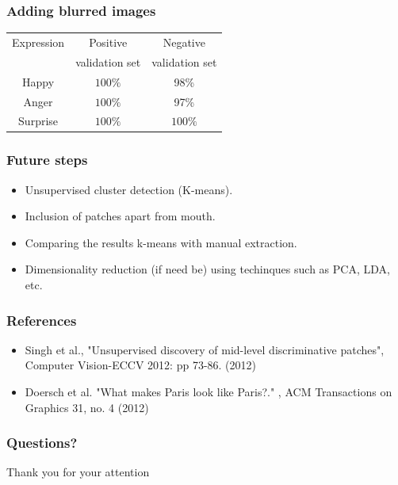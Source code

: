 \documentclass[serif,14pt]{beamer}
\begin{document}
\begin{frame}
  \frametitle{Adding blurred images}
\begin{tabular}{| c | c | c |}
\hline
Expression & Positive  & Negative \\
& validation set & validation set \\
\hline
Happy & $100 \%$ & 98\% \\
Anger & $100\%$ & 97\% \\
Surprise & $100\%$ & $100\%$  \\
\hline
\end{tabular}
\end{frame}

\begin{frame}
  \frametitle{Future steps}
  \begin{itemize}
  	  \item Unsupervised cluster detection (K-means).
      \item Inclusion of patches apart from mouth.
      \item Comparing the results k-means with manual extraction. 
      \item Dimensionality reduction (if need be) using techinques such as PCA, LDA, etc.
 
  \end{itemize}

\end{frame}

\begin{frame}
  \frametitle{References}
  \begin{itemize}
  	  \item Singh et al., "Unsupervised discovery of mid-level discriminative patches", Computer Vision-ECCV 2012: pp 73-86. (2012)
      \item Doersch et al. "What makes Paris look like Paris?." , ACM Transactions on Graphics 31, no. 4 (2012)

  \end{itemize}

\end{frame}



\begin{frame}
  \frametitle{Questions?}
  
  \begin{center}
  \LARGE Thank you for your attention
  \end{center}
\end{frame}

\end{document}
